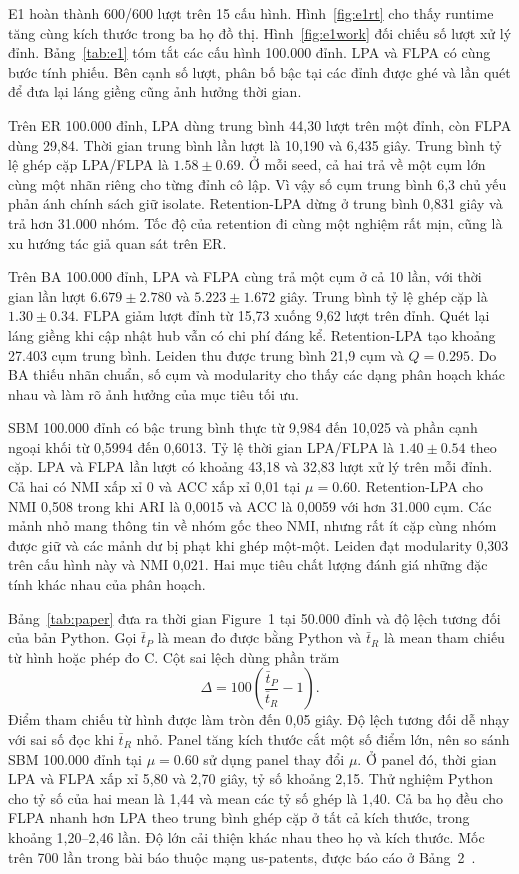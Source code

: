 E1 hoàn thành 600/600 lượt trên 15 cấu hình. Hình~\ref{fig:e1rt} cho thấy runtime tăng cùng kích thước trong ba họ đồ thị. Hình~\ref{fig:e1work} đối chiếu số lượt xử lý đỉnh. Bảng~\ref{tab:e1} tóm tắt các cấu hình 100.000 đỉnh. LPA và FLPA có cùng bước tính phiếu. Bên cạnh số lượt, phân bố bậc tại các đỉnh được ghé và lần quét để đưa lại láng giềng cũng ảnh hưởng thời gian.

Trên ER 100.000 đỉnh, LPA dùng trung bình 44,30 lượt trên một đỉnh, còn FLPA dùng 29,84. Thời gian trung bình lần lượt là 10,190 và 6,435 giây. Trung bình tỷ lệ ghép cặp LPA/FLPA là $1.58\pm0.69$. Ở mỗi seed, cả hai trả về một cụm lớn cùng một nhãn riêng cho từng đỉnh cô lập. Vì vậy số cụm trung bình 6,3 chủ yếu phản ánh chính sách giữ isolate. Retention-LPA dừng ở trung bình 0,831 giây và trả hơn 31.000 nhóm. Tốc độ của retention đi cùng một nghiệm rất mịn, cũng là xu hướng tác giả quan sát trên ER.

Trên BA 100.000 đỉnh, LPA và FLPA cùng trả một cụm ở cả 10 lần, với thời gian lần lượt $6.679\pm2.780$ và $5.223\pm1.672$ giây. Trung bình tỷ lệ ghép cặp là $1.30\pm0.34$. FLPA giảm lượt đỉnh từ 15,73 xuống 9,62 lượt trên đỉnh. Quét lại láng giềng khi cập nhật hub vẫn có chi phí đáng kể. Retention-LPA tạo khoảng 27.403 cụm trung bình. Leiden thu được trung bình 21,9 cụm và $Q=0.295$. Do BA thiếu nhãn chuẩn, số cụm và modularity cho thấy các dạng phân hoạch khác nhau và làm rõ ảnh hưởng của mục tiêu tối ưu.

SBM 100.000 đỉnh có bậc trung bình thực từ 9,984 đến 10,025 và phần cạnh ngoại khối từ 0,5994 đến 0,6013. Tỷ lệ thời gian LPA/FLPA là $1.40\pm0.54$ theo cặp. LPA và FLPA lần lượt có khoảng 43,18 và 32,83 lượt xử lý trên mỗi đỉnh. Cả hai có NMI xấp xỉ 0 và ACC xấp xỉ 0,01 tại $\mu=0.60$. Retention-LPA cho NMI 0,508 trong khi ARI là 0,0015 và ACC là 0,0059 với hơn 31.000 cụm. Các mảnh nhỏ mang thông tin về nhóm gốc theo NMI, nhưng rất ít cặp cùng nhóm được giữ và các mảnh dư bị phạt khi ghép một-một. Leiden đạt modularity 0,303 trên cấu hình này và NMI 0,021. Hai mục tiêu chất lượng đánh giá những đặc tính khác nhau của phân hoạch.

Bảng~\ref{tab:paper} đưa ra thời gian Figure~1 tại 50.000 đỉnh và độ lệch tương đối của bản Python. Gọi $\bar t_P$ là mean đo được bằng Python và $\bar t_R$ là mean tham chiếu từ hình hoặc phép đo C. Cột sai lệch dùng phần trăm
\begin{equation}
  \Delta = 100\left(\frac{\bar t_P}{\bar t_R}-1\right).
  \label{eq:deviation}
\end{equation}
Điểm tham chiếu từ hình được làm tròn đến 0,05 giây. Độ lệch tương đối dễ nhạy với sai số đọc khi $\bar t_R$ nhỏ. Panel tăng kích thước cắt một số điểm lớn, nên so sánh SBM 100.000 đỉnh tại $\mu=0.60$ sử dụng panel thay đổi $\mu$. Ở panel đó, thời gian LPA và FLPA xấp xỉ 5,80 và 2,70 giây, tỷ số khoảng 2,15. Thử nghiệm Python cho tỷ số của hai mean là 1,44 và mean các tỷ số ghép là 1,40. Cả ba họ đều cho FLPA nhanh hơn LPA theo trung bình ghép cặp ở tất cả kích thước, trong khoảng 1,20–2,46 lần. Độ lớn cải thiện khác nhau theo họ và kích thước. Mốc trên 700 lần trong bài báo thuộc mạng us-patents, được báo cáo ở Bảng~2~\cite{flpa}.

